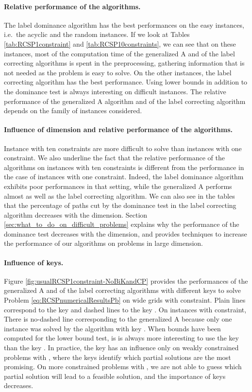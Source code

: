 \documentclass[11pt]{amsart}
\theoremstyle{plain}
\theoremstyle{remark}
\begin{document}
\paragraph{Relative performance of the algorithms.} The label dominance algorithm has the best performances on the easy instances, i.e.~the acyclic and the random instances. If we look at Tables \ref{tab:RCSP1constraint} and \ref{tab:RCSP10constraints}, we can see that on these instances, most of the computation time of the generalized A and of the label correcting algorithms is spent in the preprocessing, gathering information that is not needed as the problem is easy to solve. On the other instances, the label correcting algorithm has the best performance. Using lower bounds in addition to the dominance test is always interesting on difficult instances. The relative performance of the generalized A algorithm and of the label correcting algorithm depends on the family of instances considered.

\paragraph{Influence of dimension and relative performance of the algorithms.} Instance with ten constraints are more difficult to solve than instances with one constraint. We also underline the fact that the relative performance of the algorithms on instances with ten constraints is different from the performance in the case of instances with one constraint. Indeed, the label dominance algorithm exhibits poor performances in that setting, while the generalized A performs almost as well as the label correcting algorithm. We can also see in the tables that the percentage of paths cut by the dominance test in the label correcting algorithm decreases with the dimension. Section \ref{sec:what_to_do_on_difficult_problems} explains why the performance of the dominance test decreases with the dimension, and provides techniques to increase the performance of our algorithms on problems in large dimension. 

\paragraph{Influence of keys.} Figure \ref{fig:usualRCSP1constraint-NoBiKandCP} provides the performances of the generalized A and of the label correcting algorithms with different keys to solve Problem \eqref{eq:RCSPnumericalResultsPb} on wide grids with  constraint.  Plain lines correspond to the key  and dashed lines to the key . On instances with  constraint, There is no-dashed line corresponding to the generalized A because only one instance was solved by the algorithm with key . When bounds  have been computed for the lower bound test, is is always more interesting to use the key  than the key . In practice, the key has an influence only on weakly constrained problems with , where the keys  identify which partial solutions are the most promising. On more constrained problems with , we are not able to guess which partial solution will lead to a feasible solution, and the importance of keys decreases.
\end{document}
